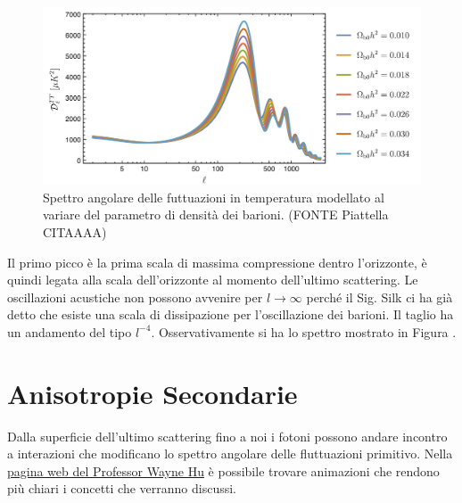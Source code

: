 \begin{figure}[H]
    \centering
    \includegraphics[width=.8 \textwidth]{Pictures/11/angspecmodel.jpg}
    \caption{Spettro angolare delle futtuazioni in temperatura modellato al variare del parametro di densità dei barioni. (FONTE Piattella CITAAAA) }\label{fig11:cttmodelb}
\end{figure}

Il primo picco è la prima scala di massima compressione dentro l'orizzonte, è quindi legata alla scala dell'orizzonte al momento dell'ultimo scattering. Le oscillazioni acustiche non possono avvenire per $l\to \infty$ perché il Sig. Silk ci ha già detto che esiste una scala di dissipazione per l'oscillazione dei barioni. Il taglio ha un andamento del tipo $l^{-4}$. Osservativamente si ha lo spettro mostrato in Figura \label{fig11:cttobs}.




\section{Anisotropie Secondarie}
Dalla superficie dell'ultimo scattering fino a noi i fotoni possono andare incontro a interazioni che modificano lo spettro angolare delle fluttuazioni primitivo. Nella \href{http://background.uchicago.edu/~whu/intermediate/intermediate.html}{pagina web del Professor Wayne Hu} è possibile trovare animazioni che rendono più chiari i concetti che verranno discussi.

